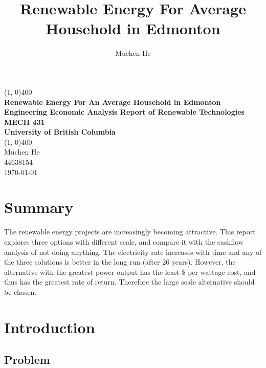 \documentclass[10pt,letterpaper]{article}
\author{Muchen He}
\title{Renewable Energy For Average Household in Edmonton}
\begin{document}
\begin{titlepage}
	\begin{center}
		\vspace*{3in}
		\line(1, 0){400}\\
		\Huge{\textbf{Renewable Energy For An Average Household in Edmonton}}\\[0.2cm]
		\large{\textbf{Engineering Economic Analysis Report of Renewable Technologies}}\\[1cm]
		\Large{\textbf{MECH 431}}\\
		\textbf{University of British Columbia}\\
		\line(1, 0){400}\\
		\vfill
		\Large{Muchen He}\\
		44638154\\

		\today\\
	\end{center}
\end{titlepage}

\section*{Summary}
The renewable energy projects are increasingly becoming attractive. This report explores three options with different scale, and compare it with the cashflow analysis of not doing anything. The electricity rate increases with time and any of the three solutions is better in the long run (after 26 years). However, the alternative with the greatest power output has the least \$ per wattage cost, and thus has the greatest rate of return. Therefore the large scale alternative should be chosen.\\
\clearpage

\setcounter{secnumdepth}{3}
\tableofcontents
\thispagestyle{empty}
\clearpage

\thispagestyle{empty}
\listoffigures
\listoftables
\newpage

\setcounter{page}{1}

\section{Introduction}\label{section:introduction}

\subsection{Problem}
\end{document}
